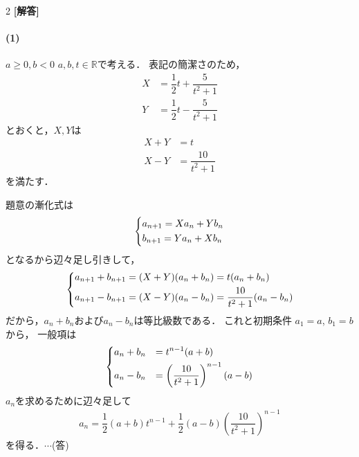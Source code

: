 \documentclass[../../main.tex]{subfiles}
\begin{document}
\setcounter{equation}{0}
\setcounter{figure}{0}
\setcounter{table}{0}
\begin{oframed}
  
\end{oframed}
\setlength{\columnseprule}{0.4pt}
\begin{multicols}{2}
  {\bf [解答]}

  \paragraph{(1)}
  $a \ge 0, b < 0$
  $a, b, t \in \mathbb{R}$で考える．
  表記の簡潔さのため，
  \begin{align}
    X & = \dfrac{1}{2}t + \dfrac{5}{t^2+1} \\
    Y & = \dfrac{1}{2}t - \dfrac{5}{t^2+1}
  \end{align}
  とおくと，$X,Y$は
  \begin{align}
    X+Y & =t                \\
    X-Y & =\dfrac{10}{t^2+1}
  \end{align}
  を満たす．

  題意の漸化式は
  \begin{align}
    \begin{dcases}
      a_{n+1} = Xa_n + Y b_n \\
      b_{n+1} = Ya_n + X b_n
    \end{dcases}
  \end{align}
  となるから辺々足し引きして，
  \begin{align}
    \begin{dcases}
      a_{n+1} + b_{n+1} = (X+Y)(a_n+b_n) = t(a_n+b_n) \\
      a_{n+1} - b_{n+1} = (X-Y)(a_n-b_n) = \dfrac{10}{t^2+1}(a_n-b_n)
    \end{dcases}
  \end{align}
  だから，$a_n+b_n$および$a_n-b_n$は等比級数である．
  これと初期条件 $a_1=a$, $b_1=b$ から，
  一般項は
  \begin{align}
    \begin{dcases}
      a_n + b_n & = t^{n-1}(a+b)                             \\
      a_n - b_n & = \left(\dfrac{10}{t^2+1}\right)^{n-1}(a-b)
    \end{dcases}
  \end{align}
  $a_n$を求めるために辺々足して
  \begin{align}
    a_n = \dfrac{1}{2}(a+b)t^{n-1} + \dfrac{1}{2}(a-b)\left(\dfrac{10}{t^2+1}\right)^{n-1}
  \end{align}
  を得る．$\cdots$(答)


\end{multicols}
\end{document}
